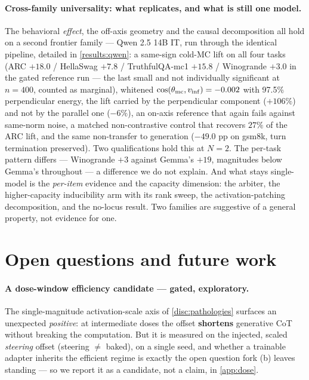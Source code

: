 \paragraph{Cross-family universality: what replicates, and what is still one model.}
The behavioral \emph{effect}, the off-axis geometry and the causal decomposition all
hold on a second frontier family --- Qwen 2.5 14B IT, run through the identical
pipeline, detailed in \cref{results:qwen}: a same-sign cold-MC lift on all four tasks
(ARC $+18.0$ / HellaSwag $+7.8$ / TruthfulQA-mc1 $+15.8$ / Winogrande $+3.0$ in the
gated reference run --- the last small and not individually significant at $n{=}400$,
counted as marginal), whitened $\cos(\theta_{\mathrm{mc}}, v_{\mathrm{inf}}) = -0.002$ with 97.5\%
perpendicular energy, the lift carried by the perpendicular component ($+106\%$) and
not by the parallel one ($-6\%$), an on-axis reference that again fails against
same-norm noise, a matched non-contrastive control that recovers $27\%$ of the ARC
lift, and the same non-transfer to generation ($-49.0$ pp on gsm8k, turn termination
preserved). Two qualifications hold this at $N{=}2$. The per-task pattern differs ---
Winogrande $+3$ against Gemma's $+19$, magnitudes below Gemma's throughout --- a
difference we do not explain. And what stays single-model is the \emph{per-item}
evidence and the capacity dimension: the arbiter, the higher-capacity inducibility
arm with its rank sweep, the activation-patching decomposition, and the no-locus
result. Two families are suggestive of a general property, not evidence for one.

\section{Open questions and future work}\label{sec:open}

\paragraph{A dose-window efficiency candidate --- gated, exploratory.}
The single-magnitude activation-scale axis of \cref{disc:pathologies} surfaces an
unexpected \emph{positive}: at intermediate doses the offset \textbf{shortens}
generative CoT without breaking the computation. But it is measured on the
injected, scaled \emph{steering} offset (steering ${\neq}$ baked), on a single
seed, and whether a trainable adapter inherits the efficient regime is exactly the
open question fork (b) leaves standing --- so we report it as a candidate, not a
claim, in \cref{app:dose}.

